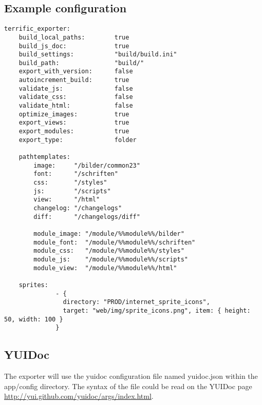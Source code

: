 

\newpage
\subsection{Example configuration}

\begin{verbatim}
terrific_exporter:
	build_local_paths:        true
	build_js_doc:             true
	build_settings:           "build/build.ini"
	build_path:               "build/"
	export_with_version:      false
	autoincrement_build:      true
	validate_js:              false
	validate_css:             false
	validate_html:            false
	optimize_images:          true
	export_views:             true
	export_modules:           true
	export_type:              folder

	pathtemplates:
        image:     "/bilder/common23"
        font:      "/schriften"
        css:       "/styles"
        js:        "/scripts"
        view:      "/html"
        changelog: "/changelogs"
        diff:	   "/changelogs/diff"

        module_image: "/module/%%module%%/bilder"
        module_font:  "/module/%%module%%/schriften"
        module_css:   "/module/%%module%%/styles"
        module_js:    "/module/%%module%%/scripts"
        module_view:  "/module/%%module%%/html"

	sprites:
              - {
                directory: "PROD/internet_sprite_icons",
                target: "web/img/sprite_icons.png", item: { height: 50, width: 100 }
              }

\end{verbatim}

\subsection{YUIDoc}
The exporter will use the yuidoc configuration file named yuidoc.json within the app/config directory. The syntax of the file could be read on the YUIDoc page \url{http://yui.github.com/yuidoc/args/index.html}.

